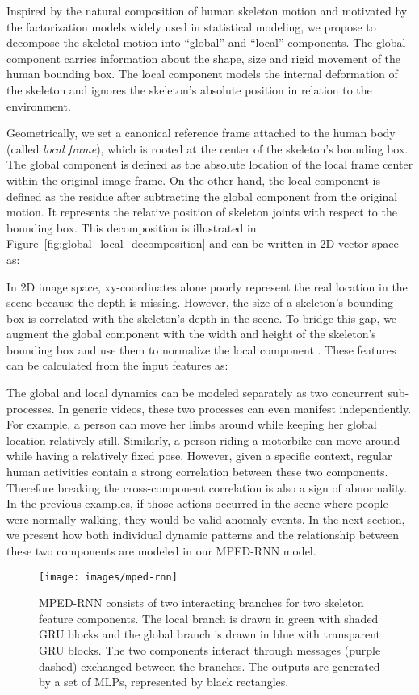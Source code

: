 Inspired by the natural composition of human skeleton motion and motivated
by the factorization models widely used in statistical modeling, we
propose to decompose the skeletal motion into ``global'' and ``local''
components. The global component carries information about the shape,
size and rigid movement of the human bounding box. The local component
models the internal deformation of the skeleton and ignores the skeleton's
absolute position in relation to the environment. 

Geometrically, we set a canonical reference frame attached to the
human body (called \emph{local frame}), which is rooted at the center
of the skeleton's bounding box. The global component is defined as
the absolute location of the local frame center within the original
image frame. On the other hand, the local component is defined as
the residue after subtracting the global component from the original
motion. It represents the relative position of skeleton joints with
respect to the bounding box. This decomposition is illustrated in
Figure~\ref{fig:global_local_decomposition} and can be written in
2D vector space as: 


In 2D image space, xy-coordinates alone poorly represent the real
location in the scene because the depth is missing. However, the size
of a skeleton's bounding box is correlated with the skeleton's depth
in the scene. To bridge this gap, we augment the global component
with the width and height of the skeleton's bounding box 
and use them to normalize the local component .
These features can be calculated from the input features as:

 

The global and local dynamics can be modeled separately as two concurrent
sub-processes. In generic videos, these two processes can even manifest
independently. For example, a person can move her limbs around while
keeping her global location relatively still. Similarly, a person
riding a motorbike can move around while having a relatively fixed
pose. However, given a specific context, regular human activities
contain a strong correlation between these two components. Therefore
breaking the cross-component correlation is also a sign of abnormality.
In the previous examples, if those actions occurred in the scene where
people were normally walking, they would be valid anomaly events.
In the next section, we present how both individual dynamic patterns
and the relationship between these two components are modeled in our
MPED-RNN model.
\begin{center}
\begin{figure*}[h]
\centering{}\texttt{[image: images/mped-rnn]}\caption{MPED-RNN consists of two interacting branches for two skeleton feature
components. The local branch is drawn in green with shaded GRU blocks
and the global branch is drawn in blue with transparent GRU blocks.
The two components interact through messages (purple dashed) exchanged
between the branches. The outputs are generated by a set of MLPs,
represented by black rectangles.\label{fig:comprae_architecture}}
\end{figure*}
\par\end{center}

